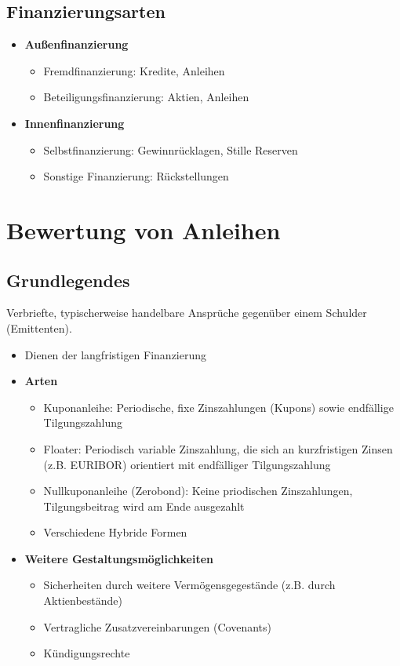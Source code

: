 \subsection{Finanzierungsarten}
\begin{itemize}
	\item \textbf{Außenfinanzierung}
	\begin{itemize}
		\item Fremdfinanzierung: Kredite, Anleihen
		\item Beteiligungsfinanzierung: Aktien, Anleihen
	\end{itemize}
	\item \textbf{Innenfinanzierung}
	\begin{itemize}
		\item Selbstfinanzierung: Gewinnrücklagen, Stille Reserven
		\item Sonstige Finanzierung: Rückstellungen
	\end{itemize}
\end{itemize}



\section{Bewertung von Anleihen}

\subsection{Grundlegendes}
Verbriefte, typischerweise handelbare Ansprüche gegenüber einem Schulder (Emittenten).
\begin{itemize}
	\item Dienen der langfristigen Finanzierung
	\item \textbf{Arten}
	\begin{itemize}
		\item Kuponanleihe: Periodische, fixe Zinszahlungen (Kupons) sowie endfällige Tilgungszahlung
		\item Floater: Periodisch variable Zinszahlung, die sich an kurzfristigen Zinsen (z.B. EURIBOR) orientiert mit endfälliger Tilgungszahlung
		\item Nullkuponanleihe (Zerobond): Keine priodischen Zinszahlungen, Tilgungsbeitrag wird am Ende ausgezahlt
		\item Verschiedene Hybride Formen
	\end{itemize}
	\item \textbf{Weitere Gestaltungsmöglichkeiten}
	\begin{itemize}
		\item Sicherheiten durch weitere Vermögensgegestände (z.B. durch Aktienbestände)
		\item Vertragliche Zusatzvereinbarungen (Covenants)
		\item Kündigungsrechte
	\end{itemize}
\end{itemize}



